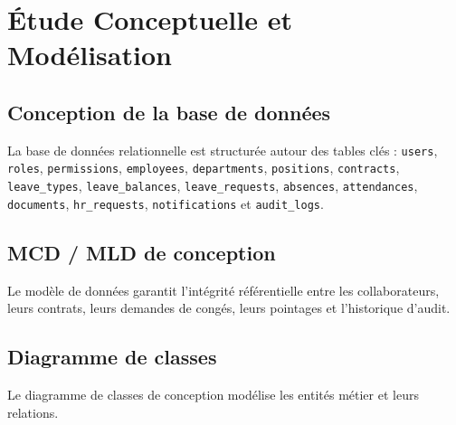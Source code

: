 \documentclass[12pt,a4paper]{report}
\begin{document}
\chapter{Étude Conceptuelle et Modélisation}

\section{Conception de la base de données}
La base de données relationnelle est structurée autour des tables clés : \texttt{users}, \texttt{roles}, \texttt{permissions}, \texttt{employees}, \texttt{departments}, \texttt{positions}, \texttt{contracts}, \texttt{leave\_types}, \texttt{leave\_balances}, \texttt{leave\_requests}, \texttt{absences}, \texttt{attendances}, \texttt{documents}, \texttt{hr\_requests}, \texttt{notifications} et \texttt{audit\_logs}.

\section{MCD / MLD de conception}
Le modèle de données garantit l'intégrité référentielle entre les collaborateurs, leurs contrats, leurs demandes de congés, leurs pointages et l'historique d'audit.

\section{Diagramme de classes}
Le diagramme de classes de conception modélise les entités métier et leurs relations.
\end{document}
